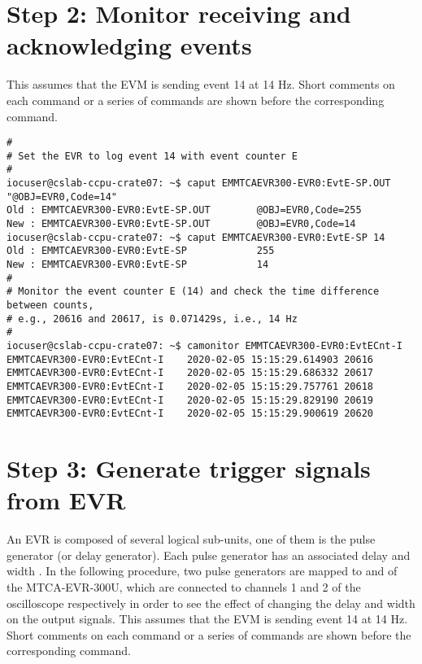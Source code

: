 \documentclass[11pt
  , a4paper
  , article
  , oneside
  , showtrims
]{memoir}
\begin{document}
{\section{Step 2: Monitor receiving and acknowledging events}
This assumes that the EVM is sending event 14 at 14 Hz. Short comments on each command or a series of commands are shown before the corresponding command.
\begin{lstlisting}[style=termstylenumber]
#
# Set the EVR to log event 14 with event counter E
#
iocuser@cslab-ccpu-crate07: ~$ caput EMMTCAEVR300-EVR0:EvtE-SP.OUT "@OBJ=EVR0,Code=14"
Old : EMMTCAEVR300-EVR0:EvtE-SP.OUT        @OBJ=EVR0,Code=255
New : EMMTCAEVR300-EVR0:EvtE-SP.OUT        @OBJ=EVR0,Code=14
iocuser@cslab-ccpu-crate07: ~$ caput EMMTCAEVR300-EVR0:EvtE-SP 14
Old : EMMTCAEVR300-EVR0:EvtE-SP            255
New : EMMTCAEVR300-EVR0:EvtE-SP            14
#
# Monitor the event counter E (14) and check the time difference between counts,
# e.g., 20616 and 20617, is 0.071429s, i.e., 14 Hz
#
iocuser@cslab-ccpu-crate07: ~$ camonitor EMMTCAEVR300-EVR0:EvtECnt-I
EMMTCAEVR300-EVR0:EvtECnt-I    2020-02-05 15:15:29.614903 20616
EMMTCAEVR300-EVR0:EvtECnt-I    2020-02-05 15:15:29.686332 20617
EMMTCAEVR300-EVR0:EvtECnt-I    2020-02-05 15:15:29.757761 20618
EMMTCAEVR300-EVR0:EvtECnt-I    2020-02-05 15:15:29.829190 20619
EMMTCAEVR300-EVR0:EvtECnt-I    2020-02-05 15:15:29.900619 20620
\end{lstlisting}


\section{Step 3: Generate trigger signals from EVR}
An EVR is composed of several logical sub-units, one of them is the pulse generator (or delay generator). Each pulse generator has an associated delay and width \cite{EVR-USER-GUIDE}. In the following procedure, two pulse generators are mapped to  and  of the MTCA-EVR-300U, which are connected to channels 1 and 2 of the oscilloscope respectively in order to see the effect of changing the delay and width on the output signals. This assumes that the EVM is sending event 14 at 14 Hz. Short comments on each command or a series of commands are shown before the corresponding command.

}
\end{document}
